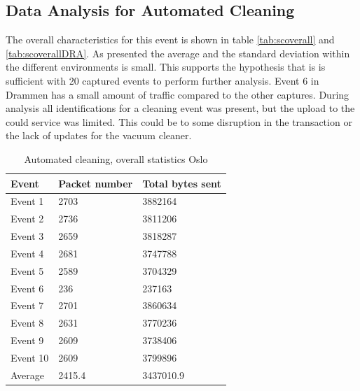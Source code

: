 \subsection{Data Analysis for Automated Cleaning}
The overall characteristics for this event is shown in table \ref{tab:scoverall} and \ref{tab:scoverallDRA}. As presented the average and the standard deviation within the different environments is small. This supports the hypothesis that is is sufficient with 20 captured events to perform further analysis. Event 6 in Drammen has a small amount of traffic compared to the other captures. During analysis all identifications for a cleaning event was present, but the upload to the could service was limited. This could be to some disruption in the transaction or the lack of updates for the vacuum cleaner. 

\begin{table}[H]
\centering
\caption{Automated cleaning, overall statistics Oslo}
\label{tab:ACoverallOSL}
\begin{tabular}{|l|l|l|}
\hline
\textbf{Event} & \textbf{Packet number} & \textbf{Total bytes sent} \\ \hline
Event 1        & 2703                   & 3882164                   \\ \hline
Event 2        & 2736                   & 3811206                   \\ \hline
Event 3        & 2659                   & 3818287                   \\ \hline
Event 4        & 2681                   & 3747788                   \\ \hline
Event 5        & 2589                   & 3704329                   \\ \hline
Event 6        & 236                    & 237163                    \\ \hline
Event 7        & 2701                   & 3860634                   \\ \hline
Event 8        & 2631                   & 3770236                   \\ \hline
Event 9        & 2609                   & 3738406                   \\ \hline
Event 10       & 2609                   & 3799896                   \\ \hline
Average        & 2415.4                 & 3437010.9                 \\ \hline
\end{tabular}
\end{table}

